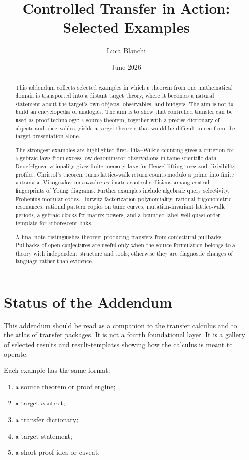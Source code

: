 \documentclass[11pt]{article}
\title{Controlled Transfer in Action: Selected Examples}
\author{Luca Blanchi}
\date{June 2026}
\begin{document}
\maketitle

\begin{abstract}
This addendum collects selected examples in which a theorem from one mathematical domain is transported into a distant target theory, where it becomes a natural statement about the target's own objects, observables, and budgets. The aim is not to build an encyclopedia of analogies. The aim is to show that controlled transfer can be used as proof technology: a source theorem, together with a precise dictionary of objects and observables, yields a target theorem that would be difficult to see from the target presentation alone.

The strongest examples are highlighted first. Pila--Wilkie counting gives a criterion for algebraic laws from excess low-denominator observations in tame scientific data. Denef--Igusa rationality gives finite-memory laws for Hensel lifting trees and divisibility profiles. Christol's theorem turns lattice-walk return counts modulo a prime into finite automata. Vinogradov mean-value estimates control collisions among central fingerprints of Young diagrams. Further examples include algebraic query selectivity, Frobenius modular codes, Hurwitz factorization polynomiality, rational trigonometric resonances, rational pattern copies on tame curves, mutation-invariant lattice-walk periods, algebraic clocks for matrix powers, and a bounded-label well-quasi-order template for arborescent links.

A final note distinguishes theorem-producing transfers from conjectural pullbacks. Pullbacks of open conjectures are useful only when the source formulation belongs to a theory with independent structure and tools; otherwise they are diagnostic changes of language rather than evidence.
\end{abstract}

\section{Status of the Addendum}

This addendum should be read as a companion to the transfer calculus and to the atlas of transfer packages. It is not a fourth foundational layer. It is a gallery of selected results and result-templates showing how the calculus is meant to operate.

Each example has the same format:
\begin{enumerate}[label=\textup{(\roman*)}]
\item a source theorem or proof engine;
\item a target context;
\item a transfer dictionary;
\item a target statement;
\item a short proof idea or caveat.
\end{enumerate}
\end{document}
